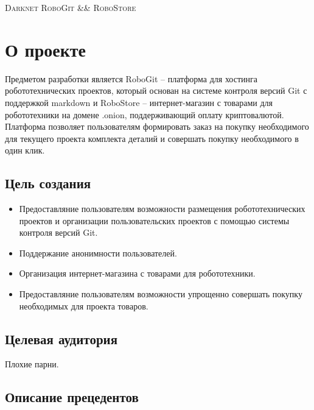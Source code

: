\documentclass[12pt, a4paper]{article}
\begin{document}



\begin{center}
\textsc{Darknet RoboGit \&\& RoboStore}
\vspace{12mm}
\end{center}
\tableofcontents
\newpage


\section{О проекте}

Предметом разработки является RoboGit -- платформа для хостинга робототехнических проектов,
который основан на системе контроля версий Git с поддержкой markdown и
RoboStore -- интернет-магазин с товарами для робототехники на домене .onion,
поддерживающий оплату криптовалютой.
Платформа позволяет пользователям формировать заказ на покупку необходимого для
текущего проекта комплекта деталий и совершать покупку необходимого в один клик.

\subsection{Цель создания}

\begin{itemize}
  \item{Предоставляние пользователям возможности размещения робототехнических
    проектов и организации пользовательских проектов
    с помощью системы контроля версий Git.}
  \item{Поддержание анонимности пользователей.}
  \item{Организация интернет-магазина с товарами для робототехники.}
  \item{Предоставляние пользователям возможности упрощенно совершать покупку
    необходимых для проекта товаров.}
\end {itemize}

\subsection{Целевая аудитория}

Плохие парни.

\subsection{Описание прецедентов}
\end{document}
